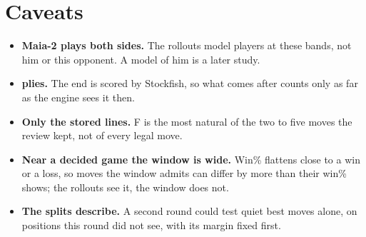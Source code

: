\documentclass[11pt]{article}
\begin{document}
\section{Caveats}

\begin{itemize}[nosep]
\item \textbf{Maia-2 plays both sides.} The rollouts model players at these bands, not him or
  this opponent. A model of him is a later study.
\item \textbf{\Plies{} plies.} The end is scored by Stockfish, so what comes after counts only as
  far as the engine sees it then.
\item \textbf{Only the stored lines.} F is the most natural of the two to five moves the review
  kept, not of every legal move.
\item \textbf{Near a decided game the window is wide.} Win\% flattens close to a win or a loss, so
  moves the window admits can differ by more than their win\% shows; the rollouts see it, the
  window does not.
\item \textbf{The splits describe.} A second round could test quiet best moves alone, on positions
  this round did not see, with its margin fixed first.
\end{itemize}
\end{document}
